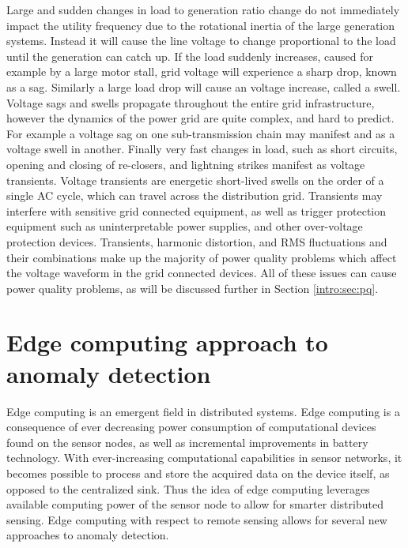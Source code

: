 Large and sudden changes in load to generation ratio change do not immediately impact the utility frequency due to the rotational inertia of the large generation systems. Instead it will cause the line voltage to change proportional to the load until the generation can catch up. If the load suddenly increases, caused for example by a large motor stall, grid voltage will experience a sharp drop, known as a sag. Similarly a large load drop will cause an voltage increase, called a swell. Voltage sags and swells propagate throughout the entire grid infrastructure, however the dynamics of the power grid are quite complex, and hard to predict. For example a voltage sag on one sub-transmission chain may manifest and as a voltage swell in another. Finally very fast changes in load, such as short circuits, opening and closing of re-closers, and lightning strikes manifest as voltage transients. Voltage transients are energetic short-lived swells on the order of a single AC cycle, which can travel across the distribution grid. Transients may interfere with sensitive grid connected equipment, as well as trigger protection equipment such as uninterpretable power supplies, and other over-voltage protection devices. Transients, harmonic distortion, and RMS fluctuations and their combinations make up the majority of power quality problems which affect the voltage waveform in the grid connected devices. \cite{5154067} All of these issues can cause power quality problems, as will be discussed further in Section \ref{intro:sec:pq}.

\section{Edge computing approach to anomaly detection}\label{intro:edge}
Edge computing is an emergent field in distributed systems. Edge computing is a consequence of ever decreasing power consumption of computational devices found on the sensor nodes, as well as incremental improvements in battery technology. With ever-increasing computational capabilities in sensor networks, it becomes possible to process and store the acquired data on the device itself, as opposed to the centralized sink. Thus the idea of edge computing leverages available computing power of the sensor node to allow for smarter distributed sensing. Edge computing with respect to remote sensing allows for several new approaches to anomaly detection. 

